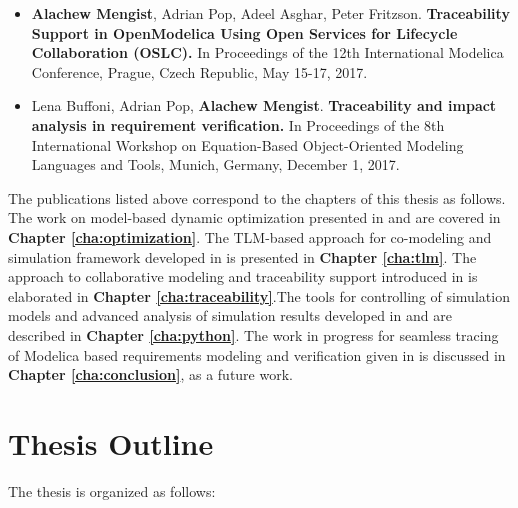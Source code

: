 \begin{itemize}
\item[\begin{NoHyper} \cite{alachewtraceability} \end{NoHyper}]  \textbf{Alachew Mengist}, Adrian Pop, Adeel Asghar, Peter Fritzson. \textbf{Traceability Support in OpenModelica Using Open Services for Lifecycle Collaboration (OSLC).} In Proceedings of the 12th International Modelica Conference, Prague, Czech Republic, May 15-17, 2017. 

\item[\begin{NoHyper} \cite{alachewrequirementstraceability} \end{NoHyper}]  Lena Buffoni, Adrian Pop, \textbf{Alachew Mengist}. \textbf{Traceability and impact analysis in requirement verification.} In Proceedings of the 8th International Workshop on Equation-Based Object-Oriented Modeling Languages and Tools, Munich, Germany, December 1, 2017. 

\end{itemize}

The publications listed above correspond to the chapters of this thesis as follows. The work on model-based dynamic optimization presented in \cite{alachewoptimization} and \cite{alachewoptimizationdemo} are covered in  \textbf{Chapter \ref{cha:optimization}}. The TLM-based approach for co-modeling and simulation framework developed in \cite{alachewtlm} is presented in \textbf{Chapter \ref{cha:tlm}}. The approach to collaborative modeling and traceability support introduced in \cite{alachewtraceability} is elaborated in \textbf{Chapter \ref{cha:traceability}}.The tools for controlling of simulation models and advanced analysis of simulation results developed in \cite{alachewompython} and \cite{alachewpysimulator} are described in \textbf{Chapter \ref{cha:python}}.  The work in progress for seamless tracing of Modelica based requirements modeling and verification given in \cite{alachewrequirementstraceability} is discussed in \textbf{Chapter \ref{cha:conclusion}}, as a future work.


\section{Thesis Outline}
\label{sec:Thesis Outline}

The thesis is organized as follows:

